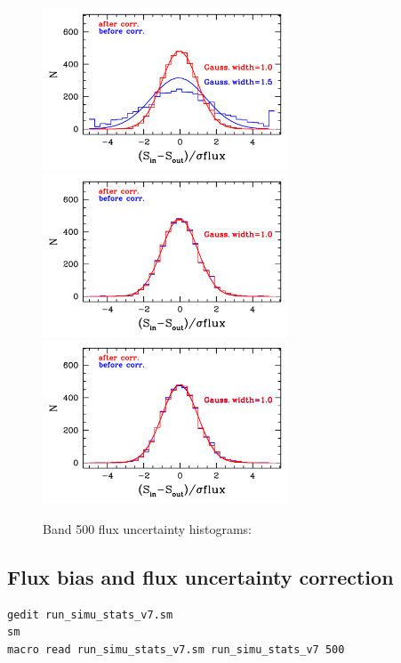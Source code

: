\documentclass[11pt,a4paper]{article}
\begin{document}
\begin{figure}[H]
	\caption{
		Band 500 flux uncertainty histograms:
	}
	\includegraphics[width=0.65\textwidth]{galsim_500_hist_dfcorr_1}
	\includegraphics[width=0.65\textwidth]{galsim_500_hist_dfcorr_2}
	\includegraphics[width=0.65\textwidth]{galsim_500_hist_dfcorr_3}
\end{figure}


\subsection{Flux bias and flux uncertainty correction}
\label{Band500_dfcorr}

\begin{lstlisting}[language=bash]
gedit run_simu_stats_v7.sm
sm
macro read run_simu_stats_v7.sm run_simu_stats_v7 500
\end{lstlisting}
\end{document}
